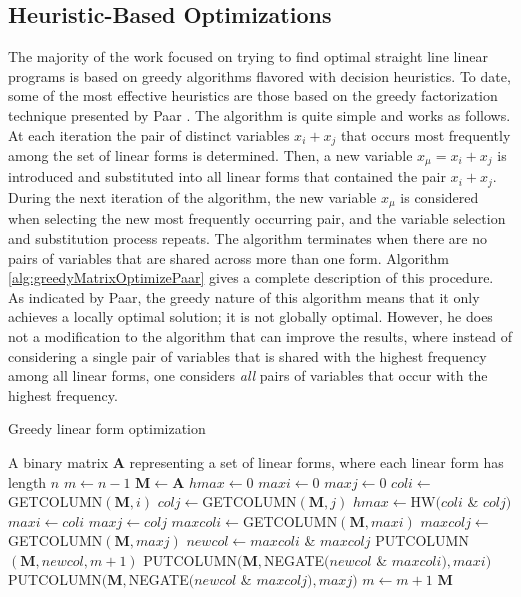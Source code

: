\subsection{Heuristic-Based Optimizations} \label{sec:linearOptTechniques}
The majority of the work focused on trying to find optimal straight line linear programs is based on greedy algorithms flavored with decision heuristics. To date, some of the most effective heuristics are those based on the greedy factorization technique presented by Paar \cite{Paar97-1}. The algorithm is quite simple and works as follows. At each iteration the pair of distinct variables $x_i + x_j$ that occurs most frequently among the set of linear forms is determined. Then, a new variable $x_{\mu} = x_i + x_j$ is introduced and substituted into all linear forms that contained the pair $x_i + x_j$. During the next iteration of the algorithm, the new variable $x_{\mu}$ is considered when selecting the new most frequently occurring pair, and the variable selection and substitution process repeats. The algorithm terminates when there are no pairs of variables that are shared across more than one form. Algorithm \ref{alg:greedyMatrixOptimizePaar} gives a complete description of this procedure. As indicated by Paar, the greedy nature of this algorithm means that it only achieves a locally optimal solution; it is not globally optimal. However, he does not a modification to the algorithm that can improve the results, where instead of considering a single pair of variables that is shared with the highest frequency among all linear forms, one considers \emph{all} pairs of variables that occur with the highest frequency.

\begin{algorithm}[ht!] %
\caption{Greedy linear form optimization \cite{Paar97-1}} \label{alg:greedyMatrixOptimizePaar}
\begin{algorithmic}[1]
	\Require A binary matrix $\mathbf{A}$ representing a set of linear forms, where each linear form has length $n$
	\State $m \gets n - 1$
	\State $\mathbf{M} \gets \mathbf{A}$
	\State $hmax \gets 0$
	\State $maxi \gets 0$
	\State $maxj \gets 0$
	\Repeat 
				\State $coli \gets $GETCOLUMN$(\mathbf{M}, i)$
				\State $colj \gets $GETCOLUMN$(\mathbf{M}, j)$
					\State $hmax \gets $HW$(coli $ \& $ colj)$
					\State $maxi \gets coli$
					\State $maxj \gets colj$
				\EndIf
			\EndFor
		\EndFor
			\State $maxcoli \gets $GETCOLUMN$(\mathbf{M}, maxi)$
			\State $maxcolj \gets $GETCOLUMN$(\mathbf{M}, maxj)$
			\State $newcol \gets maxcoli $ \& $ maxcolj$
			\State PUTCOLUMN$(\mathbf{M}, newcol, m + 1)$
			\State PUTCOLUMN$(\mathbf{M}, $NEGATE$(newcol $ \& $ maxcoli), maxi)$
			\State PUTCOLUMN$(\mathbf{M}, $NEGATE$(newcol $ \& $ maxcolj), maxj)$
			\State $m \gets m + 1$
		\EndIf
	\State \Return $\mathbf{M}$
\end{algorithmic}
\end{algorithm}

